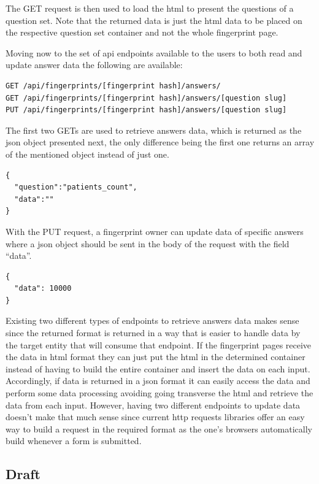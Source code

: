 The GET request is then used to load the \gls{html} to present the questions of a question set.
Note that the returned data is just the \gls{html} data to be placed on the respective question set container and not the whole fingerprint page.

Moving now to the set of \gls{api} endpoints available to the users to both read and update answer data the following are available:

\begin{verbatim}
GET /api/fingerprints/[fingerprint hash]/answers/
GET /api/fingerprints/[fingerprint hash]/answers/[question slug]
PUT /api/fingerprints/[fingerprint hash]/answers/[question slug]
\end{verbatim}

The first two GETs are used to retrieve answers data, which is returned as the \gls{json} object presented next, the only difference being the first one returns an array of the mentioned object instead of just one.

\begin{verbatim}
{
  "question":"patients_count",
  "data":""
}
\end{verbatim}

With the PUT request, a fingerprint owner can update data of specific answers where a \gls{json} object should be sent in the body of the request with the field ``data''.

\begin{verbatim}
{
  "data": 10000
}
\end{verbatim}

Existing two different types of endpoints to retrieve answers data makes sense since the returned format is returned in a way that is easier to handle data by the target entity that will consume that endpoint.
If the fingerprint pages receive the data in \gls{html} format they can just put the \gls{html} in the determined container instead of having to build the entire container and insert the data on each input.
Accordingly, if data is returned in a \gls{json} format it can easily access the data and perform some data processing avoiding going transverse the \gls{html} and retrieve the data from each input.
However, having two different endpoints to update data doesn't make that much sense since current \gls{http} requests libraries offer an easy way to build a request in the required format as the one's browsers automatically build whenever a form is submitted.

\subsection*{Draft}

